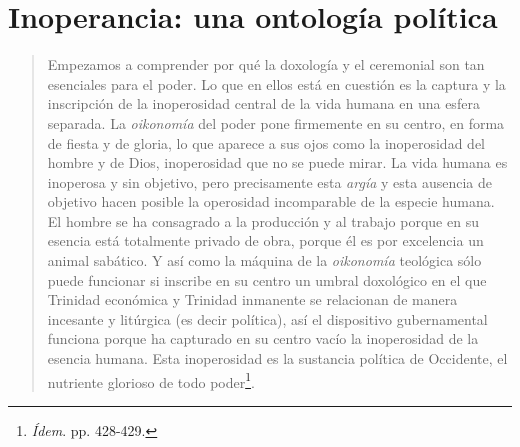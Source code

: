 \section{Inoperancia: una ontología política}

\begin{quote}
Empezamos a comprender por qué la doxología y el ceremonial son tan esenciales para el poder. Lo que en ellos está en cuestión es la captura y la inscripción de la inoperosidad central de la vida humana en una esfera separada. La \emph{oikonomía} del poder pone firmemente en su centro, en forma de fiesta y de gloria, lo que aparece a sus ojos como la inoperosidad del hombre y de Dios, inoperosidad que no se puede mirar. La vida humana es inoperosa y sin objetivo, pero precisamente esta \emph{argía} y esta ausencia de objetivo hacen posible la operosidad incomparable de la especie humana. El hombre se ha consagrado a la producción y al trabajo porque en su esencia está totalmente privado de obra, porque él es por excelencia un animal sabático. Y así como la máquina de la \emph{oikonomía} teológica sólo puede funcionar si inscribe en su centro un umbral doxológico en el que Trinidad económica y Trinidad inmanente se relacionan de manera incesante y litúrgica (es decir política), así el dispositivo gubernamental funciona porque ha capturado en su centro vacío la inoperosidad de la esencia humana. Esta inoperosidad es la sustancia política de Occidente, el nutriente glorioso de todo poder\footnote{\emph{Ídem}. pp. 428-429.}.
\end{quote}


